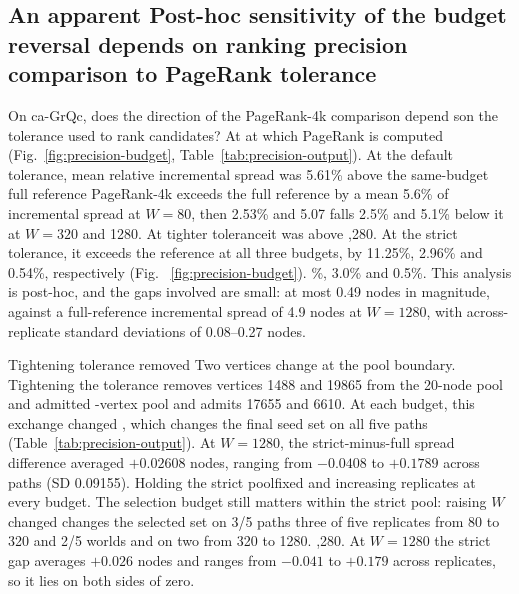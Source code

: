 \documentclass[smallextended]{svjour3}
\providecommand{\DIFaddtex}[1]{{\protect\color{blue} \sf #1}} %
\providecommand{\DIFdeltex}[1]{{\protect\color{red} \scriptsize #1}} %
\providecommand{\DIFaddbegin}{} %
\providecommand{\DIFaddend}{} %
\providecommand{\DIFdelbegin}{} %
\providecommand{\DIFdelend}{} %
\providecommand{\DIFadd}[1]{\texorpdfstring{\DIFaddtex{#1}}{#1}} %
\providecommand{\DIFdel}[1]{\texorpdfstring{\DIFdeltex{#1}}{}} %
\providecommand{\DIFscaledelfig}{0.5}
\newlength{\DIFdelgraphicswidth} %
\newlength{\DIFdelgraphicsheight} %
\providecommand{\DIFaddincludegraphics}[2][]{{\color{blue}\fbox{\DIFOincludegraphics[#1]{#2}}}} %
\providecommand{\DIFdelincludegraphics}[2][]{%
\sbox{\DIFdelgraphicsbox}{\DIFOincludegraphics[#1]{#2}}%
\settoboxwidth{\DIFdelgraphicswidth}{\DIFdelgraphicsbox} %
\settoboxtotalheight{\DIFdelgraphicsheight}{\DIFdelgraphicsbox} %
\scalebox{\DIFscaledelfig}{%
\parbox[b]{\DIFdelgraphicswidth}{\usebox{\DIFdelgraphicsbox}\\[-\baselineskip] \rule{\DIFdelgraphicswidth}{0em}}\llap{\resizebox{\DIFdelgraphicswidth}{\DIFdelgraphicsheight}{%
\setlength{\unitlength}{\DIFdelgraphicswidth}%
\begin{picture}(1,1)%
\thicklines\linethickness{2pt} %
{\color[rgb]{1,0,0}\put(0,0){\framebox(1,1){}}}%
{\color[rgb]{1,0,0}\put(0,0){\line( 1,1){1}}}%
{\color[rgb]{1,0,0}\put(0,1){\line(1,-1){1}}}%
\end{picture}%
}\hspace*{3pt}}} %
} %
\DeclareRobustCommand{\DIFaddbegin}{\DIFOaddbegin \let\includegraphics\DIFaddincludegraphics} %
\DeclareRobustCommand{\DIFaddend}{\DIFOaddend \let\includegraphics\DIFOincludegraphics} %
\DeclareRobustCommand{\DIFdelbegin}{\DIFOdelbegin \let\includegraphics\DIFdelincludegraphics} %
\DeclareRobustCommand{\DIFdelend}{\DIFOaddend \let\includegraphics\DIFOincludegraphics} %
\begin{document}
\subsection{\DIFdelbegin \DIFdel{An apparent }\DIFdelend \DIFaddbegin \DIFadd{Post-hoc sensitivity of the }\DIFaddend budget \DIFdelbegin \DIFdel{reversal depends on ranking precision}\DIFdelend \DIFaddbegin \DIFadd{comparison to PageRank tolerance}\DIFaddend }
On ca-GrQc, \DIFdelbegin \DIFdel{does }\DIFdelend the direction of the PageRank-4k comparison depend\DIFaddbegin \DIFadd{s}\DIFaddend  on the tolerance \DIFdelbegin \DIFdel{used to rank candidates? At }\DIFdelend \DIFaddbegin \DIFadd{at which PageRank is computed (Fig.~\ref{fig:precision-budget}, Table~\ref{tab:precision-output}). At the }\DIFaddend default tolerance, \DIFdelbegin \DIFdel{mean relative incremental spread was 5.61\% above the same-budget full reference }\DIFdelend \DIFaddbegin \DIFadd{PageRank-4k exceeds the full reference by a mean 5.6\% of incremental spread }\DIFaddend at $W=80$, then \DIFdelbegin \DIFdel{2.53\% and 5.07}\DIFdelend \DIFaddbegin \DIFadd{falls 2.5\% and 5.1}\DIFaddend \% below it at $W=320$ and \DIFdelbegin \DIFdel{1280. At tighter toleranceit was above }\DIFdelend \DIFaddbegin \DIFadd{1,280. At the strict tolerance, it exceeds }\DIFaddend the reference at all three budgets, by \DIFdelbegin \DIFdel{11.25\%, 2.96\% and 0.54\%, respectively (Fig.
~\ref{fig:precision-budget}).
}\DIFdelend \DIFaddbegin \DIFadd{11.3\%, 3.0\% and 0.5\%. This analysis is post-hoc, and the gaps involved are small: at most 0.49 nodes in magnitude, against a full-reference incremental spread of 4.9 nodes at $W=1280$, with across-replicate standard deviations of 0.08--0.27 nodes.
}\DIFaddend 

\DIFdelbegin \DIFdel{Tightening tolerance removed }\DIFdelend \DIFaddbegin \DIFadd{Two vertices change at the pool boundary. Tightening the tolerance removes }\DIFaddend vertices 1488 and 19865 from the \DIFdelbegin \DIFdel{20-node pool and admitted }\DIFdelend \DIFaddbegin \DIFadd{20-vertex pool and admits }\DIFaddend 17655 and \DIFdelbegin \DIFdel{6610. At each budget, this exchange changed }\DIFdelend \DIFaddbegin \DIFadd{6610, which changes }\DIFaddend the final seed set on all five \DIFdelbegin \DIFdel{paths (Table~\ref{tab:precision-output}). At $W=1280$, the strict-minus-full spread difference averaged $+0.02608$ nodes, ranging from $-0.0408$ to $+0.1789$ across paths (SD 0.09155). Holding the strict poolfixed and increasing }\DIFdelend \DIFaddbegin \DIFadd{replicates at every budget. The selection budget still matters within the strict pool: raising }\DIFaddend $W$ \DIFdelbegin \DIFdel{changed }\DIFdelend \DIFaddbegin \DIFadd{changes }\DIFaddend the selected set on \DIFdelbegin \DIFdel{3/5 paths }\DIFdelend \DIFaddbegin \DIFadd{three of five replicates }\DIFaddend from 80 to 320 \DIFdelbegin \DIFdel{and 2/5 }\DIFdelend \DIFaddbegin \DIFadd{worlds and on two }\DIFaddend from 320 to \DIFdelbegin \DIFdel{1280.
}\DIFdelend \DIFaddbegin \DIFadd{1,280. At $W=1280$ the strict gap averages $+0.026$ nodes and ranges from $-0.041$ to $+0.179$ across replicates, so it lies on both sides of zero.
}\DIFaddend 
\end{document}
